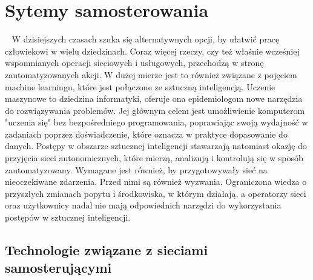 \documentclass[sn-mathphys,Numbered]{sn-jnl}
\theoremstyle{thmstyleone}%
\theoremstyle{thmstyletwo}%
\theoremstyle{thmstylethree}%
\begin{document}
\section{Sytemy samosterowania}

~   W dzisiejszych czasach szuka się alternatywnych opcji, by ułatwić pracę człowiekowi w wielu dziedzinach. Coraz więcej rzeczy, czy też właśnie wcześniej wspomnianych operacji sieciowych i usługowych, przechodzą w stronę zautomatyzowanych akcji. W dużej mierze jest to również związane z pojęciem machine learningu, które jest połączone ze sztuczną inteligencją. Uczenie maszynowe to dziedzina informatyki, oferuje ona epidemiologom nowe narzędzia do rozwiązywania problemów. Jej głównym celem jest umożliwienie komputerom "uczenia się" bez bezpośredniego programowania, poprawiając swoją wydajność w zadaniach poprzez doświadczenie, które oznacza w praktyce dopasowanie do danych\cite{bi_what_2019}. Postępy w obszarze sztucznej inteligencji stawarzają natomiast okazję do przyjęcia sieci autonomicznych, które mierzą, analizują i kontrolują się w sposób zautomatyzowany. Wymagane jest również, by przygotowywały sieć na nieoczekiwane zdarzenia\cite{kalmbach_empowering_2018}. Przed nimi są również wyzwania. Ograniczona wiedza o przyszłych zmianach popytu i środkowiska, w którym działają, a operatorzy sieci oraz użytkownicy nadal nie mają odpowiednich narzędzi do wykorzystania postępów w sztucznej inteligencji\cite{jacobs_refining_2018}. 

\subsection{Technologie związane z sieciami samosterującymi}
\end{document}
